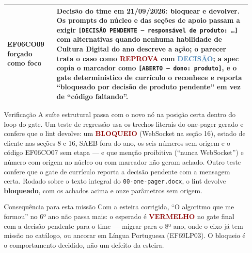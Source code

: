 \documentclass[11pt,a4paper]{article}
\newcommand{\arq}[1]{\texttt{\small #1}}
\begin{document}
\begin{small}
\begin{longtable}{@{}p{} p{}@{}}
EF06CO09 forçado como foco & Decisão do time em 21/09/2026: \textbf{bloquear e devolver}. Os prompts do núcleo e das seções de apoio passam a exigir \arq{[DECISÃO PENDENTE --- responsável de produto: \ldots]} com alternativas quando nenhuma habilidade de Cultura Digital do ano descreve a ação; o parecer trata o caso como \textcolor{DarkRed}{\textbf{REPROVA}} com \textcolor{SteelBlue}{\textbf{DECISÃO}}; a spec copia o marcador como \arq{[ABERTO --- dono: produto]}, e o gate determinístico de currículo o reconhece e reporta ``bloqueado por decisão de produto pendente'' em vez de ``código faltando''. \\
\bottomrule
\end{longtable}
\end{small}

\begin{creditobox}{Verificação}
A suíte estrutural passa com o novo nó na posição certa dentro do loop do gate. Um teste de regressão usa os trechos literais do one-pager gerado e confere que o lint devolve: um \textcolor{DarkRed}{\textbf{BLOQUEIO}} (WebSocket na seção 16), estado de cliente nas seções 8 e 16, SAEB fora do ano, os seis números sem origem e o código EF06CO07 sem etapa --- e que menção proibitiva (``nunca WebSocket'') e número com origem no núcleo ou com marcador não geram achado. Outro teste confere que o gate de currículo reporta a decisão pendente com a mensagem certa. Rodado sobre o texto integral do \arq{00-one-pager.docx}, o lint devolve \textbf{bloqueado}, com os achados acima e onze parâmetros sem origem.
\end{creditobox}

\begin{notabox}{Consequência para esta missão}
Com a esteira corrigida, ``O algoritmo que me formou'' no 6º ano não passa mais: o esperado é \textcolor{DarkRed}{\textbf{VERMELHO}} no gate final com a decisão pendente para o time --- migrar para o 8º ano, onde o eixo já tem missão no catálogo, ou ancorar em Língua Portuguesa (EF69LP03). O bloqueio é o comportamento decidido, não um defeito da esteira.
\end{notabox}
\end{document}
